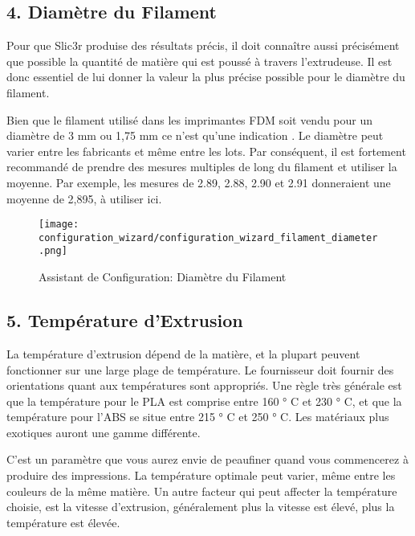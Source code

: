 \newpage
\subsection{4. Diam\`etre du Filament}
\label{sub:4_filament_diameter}
Pour que Slic3r produise des r\'esultats pr\'ecis, il doit conna\^itre aussi pr\'ecis\'ement que possible la quantit\'e de mati\`ere qui est pouss\'e \`a travers l'extrudeuse. Il est donc essentiel de lui donner la valeur la plus pr\'ecise possible pour le diam\`etre du filament.

Bien que le filament utilis\'e dans les imprimantes FDM soit vendu pour un diam\`etre de 3 mm ou 1,75 mm ce n'est qu'une indication . Le diam\`etre peut varier entre les fabricants et m\^eme entre les lots. Par cons\'equent, il est fortement recommand\'e de prendre des mesures multiples de long du filament et utiliser la moyenne. Par exemple, les mesures de 2.89, 2.88, 2.90 et 2.91 donneraient une moyenne de 2,895, \`a utiliser ici.

\begin{figure}[H]
\centering
\texttt{[image: configuration\_wizard/configuration\_wizard\_filament\_diameter.png]}
\caption{Assistant de Configuration: Diam\`etre du Filament}
\label{fig:configuration_wizard_filament_diameter}
\end{figure}

\newpage
\subsection{5. Temp\'erature d'Extrusion}
\label{sub:5_extrusion_temperature}
La temp\'erature d'extrusion d\'epend de la mati\`ere, et la plupart peuvent fonctionner sur une large plage de temp\'erature. Le fournisseur doit fournir des orientations quant aux temp\'eratures sont appropri\'es. Une r\`egle tr\`es g\'en\'erale est que la temp\'erature pour le PLA est comprise entre 160 ° C et 230 ° C, et que la temp\'erature pour l'ABS se situe entre 215 ° C et 250 ° C. Les mat\'eriaux plus exotiques auront une gamme diff\'erente.

C'est un param\`etre que vous aurez envie de peaufiner quand vous commencerez \`a produire des impressions. La temp\'erature optimale peut varier, m\^eme entre les couleurs de la m\^eme mati\`ere. Un autre facteur qui peut affecter la temp\'erature choisie, est la vitesse d'extrusion, g\'en\'eralement plus la vitesse est \'elev\'e, plus la temp\'erature est \'elev\'ee.


